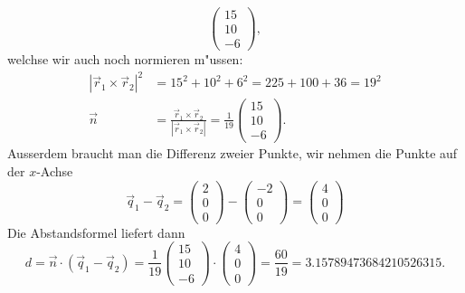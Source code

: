 \begin{loesung}
\[\begin{pmatrix}
15\\10\\ -6
\end{pmatrix},
\]
welchse wir auch noch normieren m"ussen:
\begin{align*}
|\vec r_1\times\vec r_2|^2
&=15^2+10^2+6^2=225+100+36=19^2
\\
\vec n&=
\frac{\vec r_1\times\vec r_2}{|\vec r_1\times\vec r_2|}=
\frac1{19}
\begin{pmatrix}
15\\10\\ -6
\end{pmatrix}.
\end{align*}
Ausserdem braucht man die Differenz zweier Punkte,
wir nehmen die Punkte auf der $x$-Achse
\[
\vec q_1-\vec q_2
=
\begin{pmatrix}2\\0\\0\end{pmatrix}
-
\begin{pmatrix}-2\\0\\0\end{pmatrix}
=
\begin{pmatrix}4\\0\\0\end{pmatrix}
\]
Die Abstandsformel liefert dann
\[
d=\vec n\cdot (\vec q_1-\vec q_2)=
\frac1{19}
\begin{pmatrix}
15\\10\\ -6
\end{pmatrix}
\cdot
\begin{pmatrix}4\\0\\0\end{pmatrix}
=\frac{60}{19}
=
3.15789473684210526315.
\]
\end{loesung}

